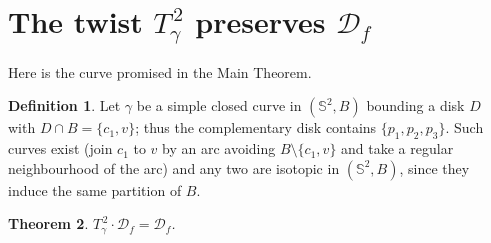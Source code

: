 \documentclass[11pt]{amsart}
\theoremstyle{plain}
\newtheorem{theorem}{Theorem}[section]
\theoremstyle{definition}
\newtheorem{definition}[theorem]{Definition}
\newcommand{\Sph}{\mathbb{S}^2}
\newcommand{\D}{\mathcal{D}}
\begin{document}
\section{The twist \texorpdfstring{$T_\gamma^{\,2}$}{T2} preserves
\texorpdfstring{$\D_f$}{Df}}\label{s:preserve}

Here is the curve promised in the Main Theorem.

\begin{definition}\label{def:gamma}
Let $\gamma$ be a simple closed curve in $(\Sph,B)$ bounding a disk $D$
with $D\cap B=\{c_1,v\}$; thus the complementary disk contains
$\{p_1,p_2,p_3\}$.  Such curves exist (join $c_1$ to $v$ by an arc
avoiding $B\setminus\{c_1,v\}$ and take a regular neighbourhood of the
arc) and any two are isotopic in $(\Sph,B)$, since they induce the same
partition of $B$.
\end{definition}

\begin{theorem}\label{thm:preserve}
$T_\gamma^{\,2}\cdot\D_f=\D_f$.
\end{theorem}
\end{document}
